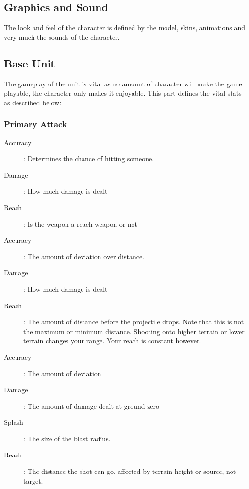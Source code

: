 \documentclass[a4paper,twocolumn]{article}
\begin{document}
\subsection{Graphics and Sound}

The look and feel of the character is defined by the model, skins, animations and very much the sounds of the character.

\subsection{Base Unit}

The gameplay of the unit is vital as no amount of character will make the game playable, the character only makes it enjoyable. This part defines the vital stats as described below:

\subsubsection{Primary Attack}

\begin{description}
\item[Accuracy]: Determines the chance of hitting someone.
\item[Damage]: How much damage is dealt
\item[Reach]: Is the weapon a reach weapon or not
\end{description}

\begin{description}
\item[Accuracy]: The amount of deviation over distance.
\item[Damage]: How much damage is dealt
\item[Reach]: The amount of distance before the projectile drops. Note that  this is not the maximum or minimum distance. Shooting onto higher terrain or lower terrain changes your range. Your reach is constant however.
\end{description}

\begin{description}
\item[Accuracy]: The amount of deviation
\item[Damage]: The amount of damage dealt at ground zero
\item[Splash]: The size of the blast radius.
\item[Reach]: The distance the shot can go, affected by terrain height or source, not target.
\end{description}
\end{document}
